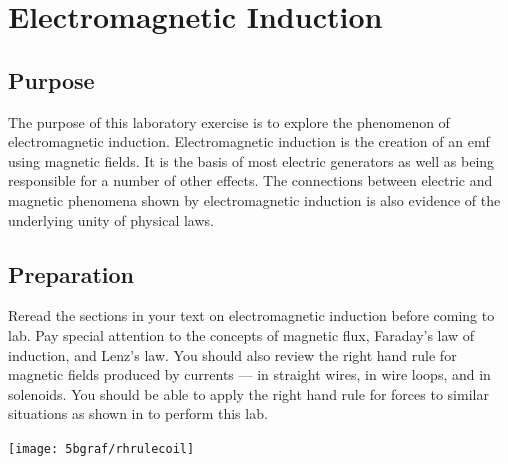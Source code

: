 \chapter{Electromagnetic Induction}

\begin{multicols}{2}
\section{Purpose}
The purpose of this laboratory exercise is to explore the phenomenon of electromagnetic induction.  Electromagnetic induction is the creation of an emf using magnetic fields.  It is the basis of most electric generators as well as being responsible for a number of other effects.  The connections between electric and magnetic phenomena shown by electromagnetic induction is also evidence of the underlying unity of physical laws.

\section{Preparation}
Reread the sections in your text on electromagnetic induction before coming to lab. Pay special attention to the concepts of magnetic flux, Faraday's law of induction, and Lenz's law.  You should also review the \textsf{right hand rule for magnetic fields} produced by currents --- in straight wires, in wire loops, and in solenoids.  You should be able to apply the \textsf{right hand rule for forces} to similar situations as shown in  to perform this lab.



\begin{center}
	\texttt{[image: 5bgraf/rhrulecoil]}
	\label{f:rhrulecoil}
\end{center}


\end{multicols}
